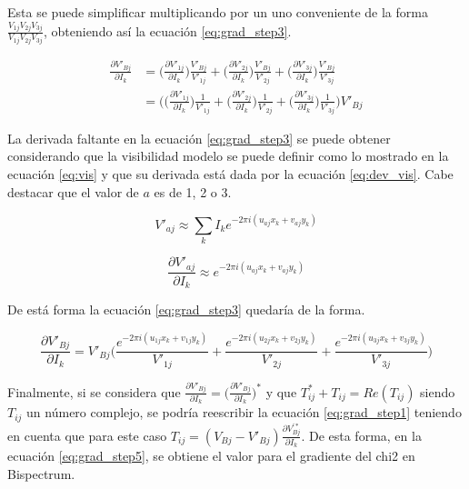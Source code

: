 Esta se puede simplificar multiplicando por un uno conveniente de la forma $\frac{V_{1j}V_{2j}V_{3j}}{V_{1j}V_{2j}V_{3j}}$, obteniendo así la ecuación \ref{eq:grad_step3}.

 \begin{equation}
    \label{eq:grad_step3}
    \begin{split}
        \frac{\partial{V'_{Bj}}}{\partial{I_{k}}} &= \bigg( \frac{\partial{V'_{1j}}}{\partial{I_{k}}}\bigg) \frac{V'_{Bj}}{V'_{1j}} + \bigg( \frac{\partial{V'_{2j}}}{\partial{I_{k}}}\bigg) \frac{V'_{Bj}}{V'_{2j}} + \bigg( \frac{\partial{V'_{3j}}}{\partial{I_{k}}}\bigg) \frac{V'_{Bj}}{V'_{3j}} \\ 
        &= \bigg(\bigg( \frac{\partial{V'_{1j}}}{\partial{I_{k}}}\bigg) \frac{1}{V'_{1j}} + \bigg( \frac{\partial{V'_{2j}}}{\partial{I_{k}}}\bigg) \frac{1}{V'_{2j}} + \bigg( \frac{\partial{V'_{3j}}}{\partial{I_{k}}}\bigg) \frac{1}{V'_{3j}} \bigg)V'_{Bj}
    \end{split}
\end{equation}

La derivada faltante en la ecuación \ref{eq:grad_step3} se puede obtener considerando que la visibilidad modelo se puede definir como lo mostrado en la ecuación \ref{eq:vis} y que su derivada está dada por la ecuación \ref{eq:dev_vis}. Cabe destacar que el valor de $a$ es de 1, 2 o 3. 

\begin{equation}
    \label{eq:vis}
    V'_{aj} \approx \sum_{k} I_{k} e^{-2\pi i (u_{aj}x_{k} + v_{aj}y_{k})}
\end{equation}

\begin{equation}
    \label{eq:dev_vis}
    \frac{\partial{V'_{aj}}}{\partial{I_{k}}} \approx e^{-2\pi i (u_{aj}x_{k} + v_{aj}y_{k})}
\end{equation}

De está forma la ecuación \ref{eq:grad_step3} quedaría de la forma.

\begin{equation}
    \label{eq:grad_step4}
    \frac{\partial{V'_{Bj}}}{\partial{I_{k}}} = V'_{Bj} \bigg( \frac{e^{-2\pi i (u_{1j}x_{k} + v_{1j}y_{k})}}{V'_{1j}} + \frac{e^{-2\pi i (u_{2j}x_{k} + v_{2j}y_{k})}}{V'_{2j}} + \frac{e^{-2\pi i (u_{3j}x_{k} + v_{3j}y_{k})}}{V'_{3j}}\bigg)
\end{equation}

Finalmente, si se considera que $\frac{\partial{V'_{Bj}}}{\partial{I_{k}}} = \bigg(\frac{\partial{V'_{Bj}}}{\partial{I_{k}}}\bigg)^* $ y que $T^*_{ij} + T_{ij} = Re(T_{ij})$ siendo $T_{ij}$ un número complejo, se podría reescribir la ecuación \ref{eq:grad_step1} teniendo en cuenta que para este caso $T_{ij} = (V_{Bj} - V'_{Bj}) \frac{\partial{V^{'*}_{Bj}}}{\partial{I_{k}}}$. De esta forma, en la ecuación \ref{eq:grad_step5}, se obtiene el valor para el gradiente del chi2 en Bispectrum.

